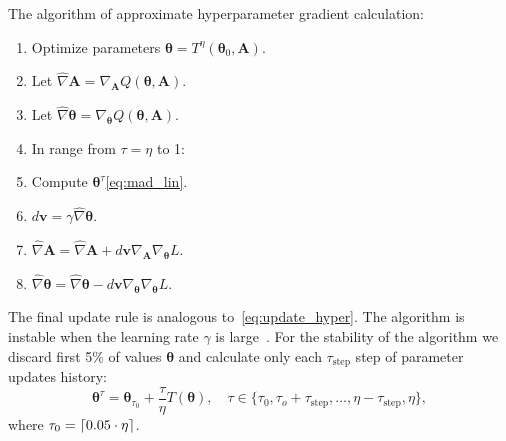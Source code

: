 \documentclass[smallcondensed]{svjour3}
\DeclarePairedDelimiter\ceil{\lceil}{\rceil}
\begin{document}
The algorithm of approximate hyperparameter gradient calculation:
\begin{enumerate}
\item Optimize  parameters $\boldsymbol{\theta} = T^\eta(\boldsymbol{\theta}_0, \mathbf{A})$.
\item Let $\hat{\nabla} \mathbf{A} = \nabla_\mathbf{A} Q(\boldsymbol{\theta}, \mathbf{A}).$ 
\item Let $\hat{\nabla} \boldsymbol{\theta} = \nabla_{\boldsymbol{\theta}} Q(\boldsymbol{\theta}, \mathbf{A}).$ 
\item In range from $\tau = \eta$ to  1:
\item Compute $\boldsymbol{\theta}^\tau$\eqref{eq:mad_lin}.
\item $d\mathbf{v} =  \gamma \hat{\nabla} {\boldsymbol{\theta}}$.
\item $\hat{\nabla} \mathbf{A} =  \hat{\nabla} \mathbf{A} + d\mathbf{v}\nabla_{\mathbf{A}} \nabla_{\boldsymbol{\theta}} L$.
\item $\hat{\nabla} \boldsymbol{\theta}  = \hat{\nabla} \boldsymbol{\theta}  - d\mathbf{v}\nabla_{\boldsymbol{\theta}} \nabla_{\boldsymbol{\theta}} L$.
\end{enumerate}
The final update rule is analogous to~\eqref{eq:update_hyper}.
The algorithm is instable when the learning rate $\gamma$ is large~\cite{hyper_mad}. For the stability of the algorithm we discard first 5\% of values  $\boldsymbol{\theta}$ and calculate only each $\tau_\text{step}$ step of parameter updates history:
\begin{equation}
\label{eq:mad_lin2}
\boldsymbol{\theta}^\tau = \boldsymbol{\theta}_{\tau_0} + \frac{\tau}{\eta} T(\boldsymbol{\theta}), \quad \tau \in \{\tau_0, \tau_o + \tau_\text{step}, \dots,\eta - \tau_\text{step}, \eta\},
\end{equation}
where $\tau_0 = \ceil{0.05 \cdot \eta}$.
\end{document}
